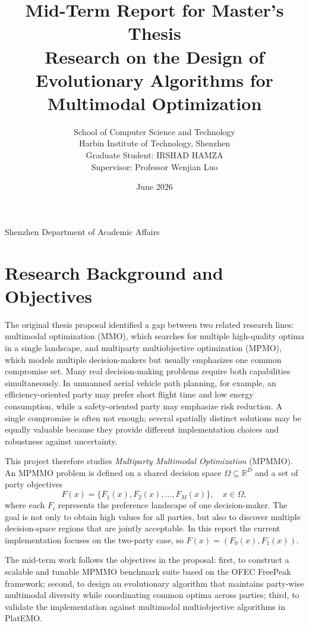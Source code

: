 \documentclass[12pt,a4paper]{article}
\title{\textbf{Mid-Term Report for Master's Thesis}\\[0.5em]
Research on the Design of Evolutionary Algorithms for Multimodal Optimization}
\author{
School of Computer Science and Technology\\
Harbin Institute of Technology, Shenzhen\\[0.5em]
Graduate Student: IRSHAD HAMZA\\
Supervisor: Professor Wenjian Luo
}
\date{June 2026}
\begin{document}
\maketitle
\thispagestyle{empty}

\begin{center}
\vfill
Shenzhen Department of Academic Affairs
\end{center}
\newpage

\tableofcontents
\newpage

\section{Research Background and Objectives}

The original thesis proposal identified a gap between two related research lines:
multimodal optimization (MMO), which searches for multiple high-quality optima in a
single landscape, and multiparty multiobjective optimization (MPMO), which models
multiple decision-makers but usually emphasizes one common compromise set. Many
real decision-making problems require both capabilities simultaneously. In unmanned
aerial vehicle path planning, for example, an efficiency-oriented party may prefer short
flight time and low energy consumption, while a safety-oriented party may emphasize
risk reduction. A single compromise is often not enough; several spatially distinct
solutions may be equally valuable because they provide different implementation
choices and robustness against uncertainty.

This project therefore studies \emph{Multiparty Multimodal Optimization} (MPMMO).
An MPMMO problem is defined on a shared decision space $\Omega \subseteq \mathbb{R}^D$
and a set of party objectives
\begin{equation}
  F(x)=\{F_1(x),F_2(x),\ldots,F_M(x)\}, \quad x \in \Omega ,
\end{equation}
where each $F_i$ represents the preference landscape of one decision-maker. The goal is
not only to obtain high values for all parties, but also to discover multiple decision-space
regions that are jointly acceptable. In this report the current implementation focuses on
the two-party case, so $F(x)=(F_0(x),F_1(x))$.

The mid-term work follows the objectives in the proposal: first, to construct a scalable
and tunable MPMMO benchmark suite based on the OFEC FreePeak framework; second, to
design an evolutionary algorithm that maintains party-wise multimodal diversity while
coordinating common optima across parties; third, to validate the implementation against
multimodal multiobjective algorithms in PlatEMO.
\end{document}
